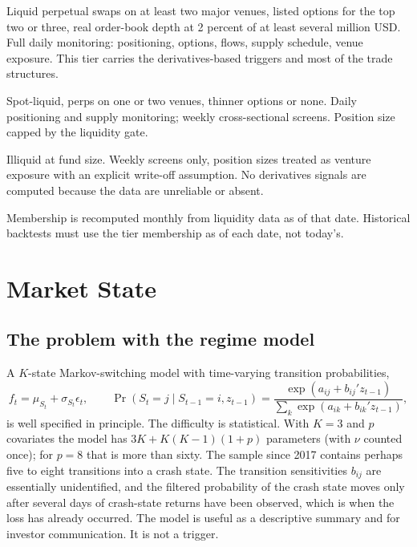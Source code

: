 \documentclass[11pt,a4paper]{article}
\theoremstyle{definition}
\begin{document}
\begin{description}[style=nextline,nosep]
\item[Tier 1 (roughly 15--25 names).] Liquid perpetual swaps on at least two major venues, listed options for the top two or three, real order-book depth at 2 percent of at least several million USD. Full daily monitoring: positioning, options, flows, supply schedule, venue exposure. This tier carries the derivatives-based triggers and most of the trade structures.
\item[Tier 2 (roughly 40--80 names).] Spot-liquid, perps on one or two venues, thinner options or none. Daily positioning and supply monitoring; weekly cross-sectional screens. Position size capped by the liquidity gate.
\item[Tier 3 (the remainder).] Illiquid at fund size. Weekly screens only, position sizes treated as venture exposure with an explicit write-off assumption. No derivatives signals are computed because the data are unreliable or absent.
\end{description}
Membership is recomputed monthly from liquidity data as of that date. Historical backtests must use the tier membership as of each date, not today's.

\section{Market State}\label{sec:state}

\subsection{The problem with the regime model}

A $K$-state Markov-switching model with time-varying transition probabilities,
\begin{equation}
f_t = \mu_{S_t} + \sigma_{S_t}\epsilon_t, \qquad \Pr(S_t = j \mid S_{t-1} = i, z_{t-1}) = \frac{\exp(a_{ij} + b_{ij}'z_{t-1})}{\sum_k \exp(a_{ik} + b_{ik}'z_{t-1})},
\end{equation}
is well specified in principle. The difficulty is statistical. With $K = 3$ and $p$ covariates the model has $3K + K(K-1)(1+p)$ parameters (with $\nu$ counted once); for $p = 8$ that is more than sixty. The sample since 2017 contains perhaps five to eight transitions into a crash state. The transition sensitivities $b_{ij}$ are essentially unidentified, and the filtered probability of the crash state moves only after several days of crash-state returns have been observed, which is when the loss has already occurred. The model is useful as a descriptive summary and for investor communication. It is not a trigger.
\end{document}
